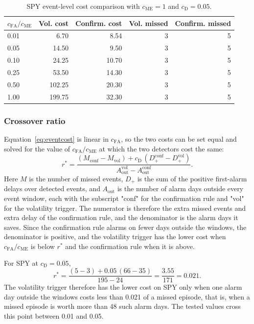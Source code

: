 \documentclass[pdflatex,sn-mathphys-num,iicol]{sn-jnl}
\begin{document}
\begin{table}[t]
\centering
\caption{SPY event-level cost comparison with $c_{\mathrm{ME}}=1$ and $c_{\mathrm{D}}=0.05$.}
\label{tab:event_cost}
\scriptsize
\begin{tabular}{lrrrr}
\toprule
$c_{\mathrm{FA}}/c_{\mathrm{ME}}$ & Vol. cost & Confirm. cost & Vol. missed & Confirm. missed\\
\midrule
0.01 & 6.70 & 8.54 & 3 & 5\\
0.05 & 14.50 & 9.50 & 3 & 5\\
0.10 & 24.25 & 10.70 & 3 & 5\\
0.25 & 53.50 & 14.30 & 3 & 5\\
0.50 & 102.25 & 20.30 & 3 & 5\\
1.00 & 199.75 & 32.30 & 3 & 5\\
\bottomrule
\end{tabular}
\end{table}

\subsubsection{Crossover ratio}
Equation~\eqref{eq:eventcost} is linear in $c_{\mathrm{FA}}$, so the two costs can be set equal and solved for the value of $c_{\mathrm{FA}}/c_{\mathrm{ME}}$ at which the two detectors cost the same:
\begin{equation}
\label{eq:crossover}
r^{*}=\frac{(M_{\mathrm{conf}}-M_{\mathrm{vol}})+c_{\mathrm{D}}\,(D_{+}^{\mathrm{conf}}-D_{+}^{\mathrm{vol}})}{A_{\mathrm{out}}^{\mathrm{vol}}-A_{\mathrm{out}}^{\mathrm{conf}}}.
\end{equation}
Here $M$ is the number of missed events, $D_+$ is the sum of the positive first-alarm delays over detected events, and $A_{\mathrm{out}}$ is the number of alarm days outside every event window, each with the subscript "conf" for the confirmation rule and "vol" for the volatility trigger. The numerator is therefore the extra missed events and extra delay of the confirmation rule, and the denominator is the alarm days it saves. Since the confirmation rule alarms on fewer days outside the windows, the denominator is positive, and the volatility trigger has the lower cost when $c_{\mathrm{FA}}/c_{\mathrm{ME}}$ is below $r^{*}$ and the confirmation rule when it is above.

For SPY at $c_{\mathrm{D}}=0.05$,
\begin{equation}
r^{*}=\frac{(5-3)+0.05\,(66-35)}{195-24}=\frac{3.55}{171}=0.021 .
\end{equation}
The volatility trigger therefore has the lower cost on SPY only when one alarm day outside the windows costs less than 0.021 of a missed episode, that is, when a missed episode is worth more than 48 such alarm days. The tested values cross this point between 0.01 and 0.05.
\end{document}
